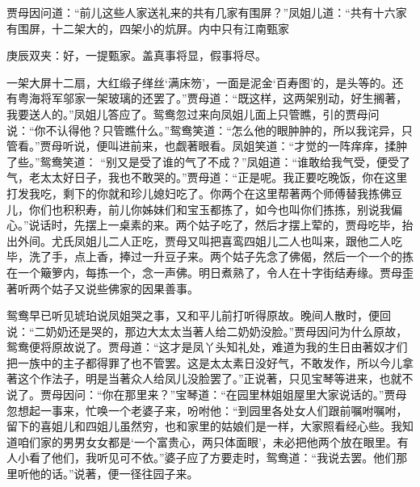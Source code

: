 \begin{parag}
    贾母因问道：“前儿这些人家送礼来的共有几家有围屏？”凤姐儿道：“共有十六家有围屏，十二架大的，四架小的炕屏。内中只有江南甄家\begin{note}庚辰双夹：好，一提甄家。盖真事将显，假事将尽。\end{note}一架大屏十二扇，大红缎子缂丝‘满床笏’，一面是泥金‘百寿图’的，是头等的。还有粤海将军邬家一架玻璃的还罢了。”贾母道：“既这样，这两架别动，好生搁著，我要送人的。”凤姐儿答应了。鸳鸯忽过来向凤姐儿面上只管瞧，引的贾母问说：“你不认得他？只管瞧什么。”鸳鸯笑道：“怎么他的眼肿肿的，所以我诧异，只管看。”贾母听说，便叫进前来，也觑著眼看。凤姐笑道：“才觉的一阵痒痒，揉肿了些。”鸳鸯笑道： “别又是受了谁的气了不成？”凤姐道：“谁敢给我气受，便受了气，老太太好日子，我也不敢哭的。”贾母道：“正是呢。我正要吃晚饭，你在这里打发我吃，剩下的你就和珍儿媳妇吃了。你两个在这里帮著两个师傅替我拣佛豆儿，你们也积积寿，前儿你姊妹们和宝玉都拣了，如今也叫你们拣拣，别说我偏心。”说话时，先摆上一桌素的来。两个姑子吃了，然后才摆上荤的，贾母吃毕，抬出外间。尤氏凤姐儿二人正吃，贾母又叫把喜鸾四姐儿二人也叫来，跟他二人吃毕，洗了手，点上香，捧过一升豆子来。两个姑子先念了佛偈，然后一个一个的拣在一个簸箩内，每拣一个，念一声佛。明日煮熟了，令人在十字街结寿缘。贾母歪著听两个姑子又说些佛家的因果善事。
\end{parag}


\begin{parag}
    鸳鸯早已听见琥珀说凤姐哭之事，又和平儿前打听得原故。晚间人散时，便回说：“二奶奶还是哭的，那边大太太当著人给二奶奶没脸。”贾母因问为什么原故，鸳鸯便将原故说了。贾母道：“这才是凤丫头知礼处，难道为我的生日由著奴才们把一族中的主子都得罪了也不管罢。这是太太素日没好气，不敢发作，所以今儿拿著这个作法子，明是当著众人给凤儿没脸罢了。”正说著，只见宝琴等进来，也就不说了。贾母因问：“你在那里来？”宝琴道：“在园里林姐姐屋里大家说话的。”贾母忽想起一事来，忙唤一个老婆子来，吩咐他：“到园里各处女人们跟前嘱咐嘱咐，留下的喜姐儿和四姐儿虽然穷，也和家里的姑娘们是一样，大家照看经心些。我知道咱们家的男男女女都是‘一个富贵心，两只体面眼’，未必把他两个放在眼里。有人小看了他们，我听见可不依。”婆子应了方要走时，鸳鸯道：“我说去罢。他们那里听他的话。”说著，便一径往园子来。
\end{parag}


